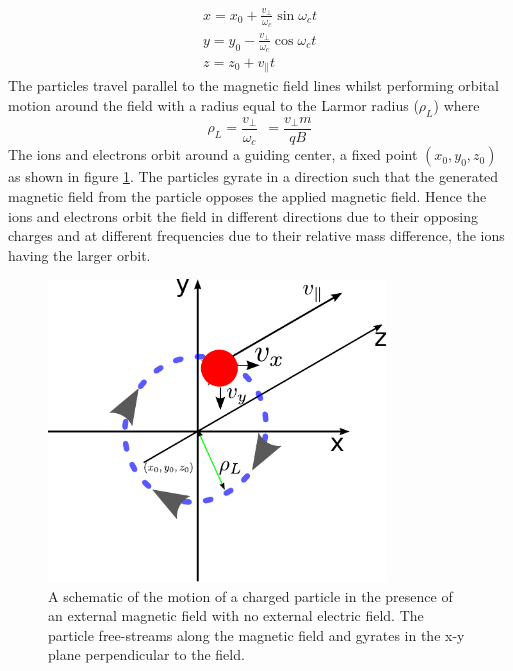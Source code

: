 \begin{equation}
\begin{split}
x = x_0 +  \frac{v_\perp}{\omega_c} \sin \omega_c t \\ 
y = y_0 -  \frac{v_\perp}{\omega_c} \cos \omega_c t \\ 
z = z_0 + v_\parallel t \ \ \ \ \ \ \ \ \ 
\end{split}
\end{equation}
The particles travel parallel to the magnetic field lines whilst performing orbital motion around the field with a radius equal to the Larmor radius ($\rho_L$)
where 
\begin{equation}
\rho_L = \frac{v_\perp}{\omega_c} \ \ = \frac{v_\perp m }{q B}
\end{equation}
The ions and electrons orbit around a guiding center, a fixed point $(x_0, y_0, z_0)$ as shown in figure \ref{fig:larmor}. The particles gyrate in a direction such that the generated magnetic field from the particle opposes the applied magnetic field. Hence the ions and electrons orbit the field in different directions due to their opposing charges and at different frequencies due to their relative mass difference, the ions having the larger orbit.

\begin{figure}[H]
		\centering
		\includegraphics[width=0.8\textwidth]{larmor.pdf}
		\caption{A schematic of the motion of a charged particle in the presence of an external magnetic field with no external electric field. The particle free-streams along the magnetic field and gyrates in the x-y plane perpendicular to the field.}
		\label{fig:larmor}
	\end{figure} 
	



